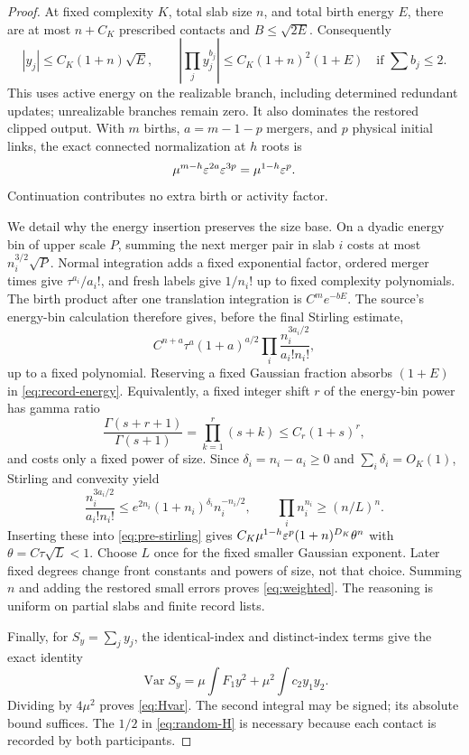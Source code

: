 \begin{proof}
At fixed complexity $K$, total slab size $n$, and total birth energy $E$,
there are at most $n+C_K$ prescribed contacts and $B\le\sqrt{2E}$.
Consequently
\begin{equation}\label{eq:record-energy}
 |y_j|\le C_K(1+n)\sqrt E,
 \qquad
 \left|\prod_jy_j^{b_j}\right|\le C_K(1+n)^2(1+E)
                             \quad\text{if }\sum b_j\le2.
\end{equation}
This uses active energy on the realizable branch, including determined
redundant updates; unrealizable branches remain zero. It also dominates the
restored clipped output. With $m$ births, $a=m-1-p$ mergers, and $p$ physical
initial links, the exact connected normalization at $h$ roots is
\begin{equation}\label{eq:scaling}
 \mu^{m-h}\varepsilon^{2a}\varepsilon^{3p}=\mu^{1-h}\varepsilon^p.
\end{equation}
Continuation contributes no extra birth or activity factor.

We detail why the energy insertion preserves the size base. On a dyadic
energy bin of upper scale $P$, summing the next merger pair in slab $i$
costs at most $n_i^{3/2}\sqrt P$. Normal integration adds a fixed exponential
factor, ordered merger times give $\tau^{a_i}/a_i!$, and fresh labels give
$1/n_i!$ up to fixed complexity polynomials. The birth product after one
translation integration is $C^m e^{-bE}$. The source's energy-bin calculation
therefore gives, before the final Stirling estimate,
\begin{equation}\label{eq:pre-stirling}
 C^{n+a}\tau^a(1+a)^{a/2}
              \prod_i\frac{n_i^{3a_i/2}}{a_i!n_i!},
\end{equation}
up to a fixed polynomial. Reserving a fixed Gaussian fraction absorbs
$(1+E)$ in \eqref{eq:record-energy}. Equivalently, a fixed integer shift
$r$ of the energy-bin power has gamma ratio
\[
 \frac{\Gamma(s+r+1)}{\Gamma(s+1)}
       =\prod_{k=1}^r(s+k)\le C_r(1+s)^r,
\]
and costs only a fixed power of size. Since $\delta_i=n_i-a_i\ge0$ and
$\sum_i\delta_i=O_K(1)$, Stirling and convexity yield
\[
 \frac{n_i^{3a_i/2}}{a_i!n_i!}
 \le e^{2n_i}(1+n_i)^{\delta_i}n_i^{-n_i/2},\qquad
 \prod_i n_i^{n_i}\ge(n/L)^n.
\]
Inserting these into \eqref{eq:pre-stirling} gives
$C_K\mu^{1-h}\varepsilon^p(1+n)^{D_K}\theta^n$ with
$\theta=C\tau\sqrt L<1$. Choose $L$ once for the fixed smaller Gaussian
exponent. Later fixed degrees change front constants and powers of size,
not that choice. Summing $n$ and adding the restored small errors proves
\eqref{eq:weighted}. The reasoning is uniform on partial slabs and finite
record lists.

Finally, for $S_y=\sum_j y_j$, the identical-index and distinct-index terms
give the exact identity
\[
 \operatorname{Var}S_y
 =\mu\int F_1 y^2+\mu^2\int c_2y_1y_2.
\]
Dividing by $4\mu^2$ proves \eqref{eq:Hvar}. The second integral may be
signed; its absolute bound suffices. The $1/2$ in \eqref{eq:random-H}
is necessary because each contact is recorded by both participants.
\end{proof}

